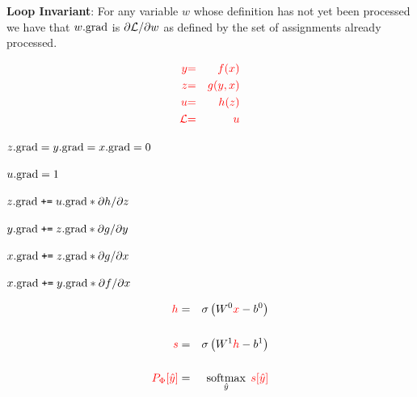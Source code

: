 {{}

\medskip
    {\bf Loop Invariant}: For any variable $w$ whose definition has not yet been processed we have that $w.\mathrm{grad}$ is $\partial {\cal L}/\partial w$ as defined by the set of assignments already processed.

\vspace{-3ex}
\begin{eqnarray*}
  {\color{red} y} & {\color{red} =} & {\color{red} f(x)} \\
  {\color{red} z} & {\color{red} =} & {\color{red} g(y,x)} \\
  {\color{red} u} & {\color{red} =} & {\color{red} h(z)} \\
  {\color{red} {\cal L}} & {\color{red} =} & {\color{red} u}
\end{eqnarray*}

{\color{red}
\medskip
$z.\mathrm{grad} = y.\mathrm{grad} = x.\mathrm{grad} = 0$

\medskip
$u.\mathrm{grad} = 1$

\medskip
$z.\mathrm{grad}\;\mbox{\tt +=}\; u.\mathrm{grad} * {\partial h}/{\partial z}$

\medskip
$y.\mathrm{grad} \;\mbox{\tt +=}\; z.\mathrm{grad} * {\partial g}/{\partial y}$

\medskip
$x.\mathrm{grad} \;\mbox{\tt +=}\; z.\mathrm{grad} * {\partial g}/{\partial x}$

\medskip
$x.\mathrm{grad} \;\mbox{\tt +=}\; y.\mathrm{grad} * {\partial f}/{\partial x}$
}



\begin{eqnarray*}
  {\color{red} h} & = & \sigma\left(W^0{\color{red} x} - b^0\right) \\
  \\
  {\color{red} s} & = & \sigma\left(W^1{\color{red} h} - b^1 \right) \\
  \\
  {\color{red} P_\Phi[\hat{y}]} & = & \operatorname*{softmax}_{\hat{y}}\;{\color{red} s[\hat{y}]}
\end{eqnarray*}

}
